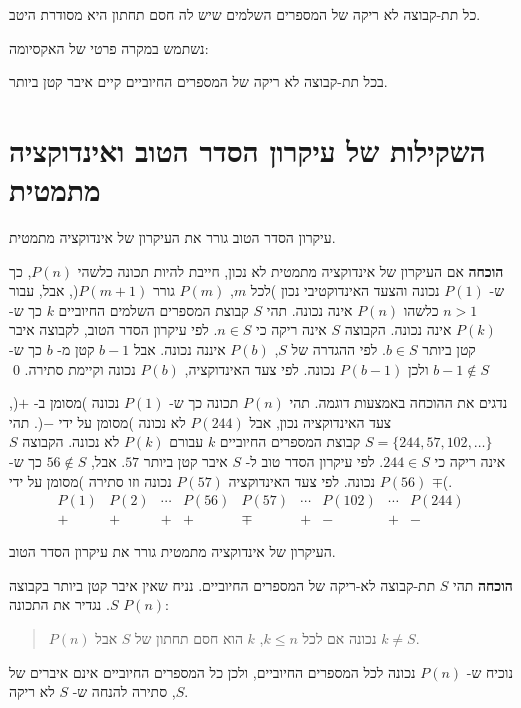 \begin{axiom}
כל תת-קבוצה לא ריקה של המספרים השלמים שיש לה חסם תחתון היא מסודרת היטב.
\end{axiom}
נשתמש במקרה פרטי של האקסיומה:
\begin{axiom}
בכל תת-קבוצה לא ריקה של המספרים החיוביים קיים איבר קטן ביותר.
\end{axiom}


\section{%
השקילות של עיקרון הסדר הטוב ואינדוקציה מתמטית%
}

\begin{theorem}\label{th.wop}
עיקרון הסדר הטוב גורר את העיקרון של אינדוקציה מתמטית.
\end{theorem}

\textbf{הוכחה}
אם העיקרון של אינדוקציה מתמטית לא נכון, חייבת להיות תכונה כלשהי
$P(n)$,
כך ש-%
$P(1)$
נכונה והצעד האינדוקטיבי נכון )לכל
$m$, $P(m)$
גורר
$P(m+1)$(,
אבל, עבור
$n>1$
כלשהו
$P(n)$
אינה נכונה. תהי
$S$
קבוצת המספרים השלמים החיוביים
$k$
כך ש-%
$P(k)$
אינה נכונה. הקבוצה
$S$
אינה ריקה כי
$n\in S$.
לפי עיקרון הסדר הטוב, לקבוצה איבר קטן ביותר
$b\in S$.
לפי ההגדרה של
$S$, $P(b)$
איננה נכונה. אבל
$b-1$
קטן מ-%
$b$
כך ש-%
$b-1\not\in S$
ולכן
$P(b-1)$
נכונה. לפי צעד האינדוקציה,
$P(b)$
נכונה וקיימת סתירה.
\qed

נדגים את ההוכחה באמצעות דוגמה. תהי 
$P(n)$
תכונה כך ש-%
$P(1)$
נכונה )מסומן ב-%
$+$(, 
צעד האינדוקציה נכון, אבל
$P(244)$
לא נכונה )מסומן על ידי
$-$(.
תהי
$S=\{244,57,102,\ldots\}$
קבוצת המספרים החיוביים
$k$
עבורם
$P(k)$
לא נכונה. הקבוצה
$S$
אינה ריקה כי
$244\in S$.
לפי עיקרון הסדר טוב ל-%
$S$
איבר קטן ביותר
$57$.
אבל,
$56\not\in S$
כך ש-%
$P(56)$
נכונה. לפי צעד האינדוקציה
$P(57)$
נכונה וזו סתירה )מסומן על ידי
$\mp$(.
\[
\begin{array}{ccccccccc}
P(1) & P(2) & \cdots & P(56) & P(57) & \cdots & P(102) & \cdots & P(244)\\
+ & + & + & + & \mp & + & -&+&-
\end{array}
\]

\vspace{-3ex}

\begin{theorem}
העיקרון של אינדוקציה מתמטית גורר את עיקרון הסדר הטוב.
\end{theorem}

\textbf{הוכחה} 
תהי
$S$
תת-קבוצה לא-ריקה של המספרים החיוביים. נניח שאין איבר קטן ביותר בקבוצה 
$S$.
נגדיר את התכונה
$P(n)$:
\begin{quote}
$P(n)$
נכונה אם לכל 
$k\leq n$, $k$
הוא  חסם תחתון של
$S$
אבל
$k\neq S$.
\end{quote}
נוכיח ש-%
$P(n)$
נכונה לכל המספרים החיוביים, ולכן כל המספרים החיוביים אינם איברים של
$S$,
סתירה להנחה ש-%
$S$
לא ריקה.

